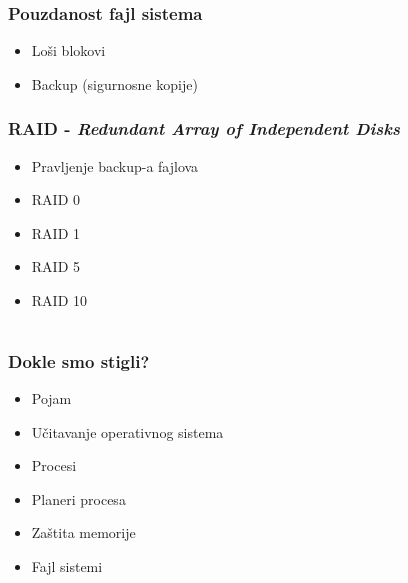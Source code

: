 \documentclass{beamer}
\begin{document}
\begin{frame}
    \frametitle{Pouzdanost fajl sistema}
    \begin{itemize}
        \item Loši blokovi \newline
        \item Backup (sigurnosne kopije)
    \end{itemize}
\end{frame}

\begin{frame}
    \frametitle{RAID - \textit{Redundant Array of Independent Disks}}
    \begin{itemize}
        \item Pravljenje backup-a fajlova \newline
        \item RAID 0 \newline
        \item RAID 1 \newline
        \item RAID 5 \newline
        \item RAID 10 \newline
    \end{itemize}
\end{frame}

\subsection*{}
\section*{}

\begin{frame}
    \frametitle{Dokle smo stigli?}
    \begin{itemize}
        \item Pojam \newline
        \item Učitavanje operativnog sistema \newline
        \item Procesi \newline
        \item Planeri procesa \newline
        \item Zaštita memorije \newline
        \item Fajl sistemi
    \end{itemize}
\end{frame}
\end{document}
